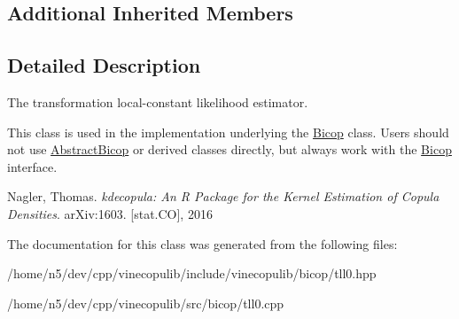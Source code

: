 \subsection*{Additional Inherited Members}


\subsection{Detailed Description}
The transformation local-\/constant likelihood estimator. 

This class is used in the implementation underlying the \hyperlink{classvinecopulib_1_1_bicop}{Bicop} class. Users should not use \hyperlink{classvinecopulib_1_1_abstract_bicop}{Abstract\+Bicop} or derived classes directly, but always work with the \hyperlink{classvinecopulib_1_1_bicop}{Bicop} interface.

Nagler, Thomas. {\itshape kdecopula\+: An R Package for the Kernel Estimation of Copula Densities}. ar\+Xiv\+:1603. \mbox{[}stat.\+CO\mbox{]}, 2016 

The documentation for this class was generated from the following files\+:\begin{DoxyCompactItemize}
\item 
/home/n5/dev/cpp/vinecopulib/include/vinecopulib/bicop/tll0.\+hpp\item 
/home/n5/dev/cpp/vinecopulib/src/bicop/tll0.\+cpp\end{DoxyCompactItemize}

